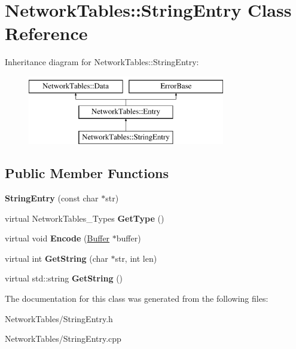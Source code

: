 \hypertarget{classNetworkTables_1_1StringEntry}{
\section{NetworkTables::StringEntry Class Reference}
\label{classNetworkTables_1_1StringEntry}
}
Inheritance diagram for NetworkTables::StringEntry:\begin{figure}[H]
\begin{center}
\leavevmode
\includegraphics[height=3.000000cm]{classNetworkTables_1_1StringEntry}
\end{center}
\end{figure}
\subsection*{Public Member Functions}
\begin{DoxyCompactItemize}
\item 
\hypertarget{classNetworkTables_1_1StringEntry_a25a26ba1aa1fcc3b678e14792e6e8b65}{
{\bfseries StringEntry} (const char $\ast$str)}
\label{classNetworkTables_1_1StringEntry_a25a26ba1aa1fcc3b678e14792e6e8b65}

\item 
\hypertarget{classNetworkTables_1_1StringEntry_a5299afb33eefea963add45e49b889256}{
virtual NetworkTables\_\-Types {\bfseries GetType} ()}
\label{classNetworkTables_1_1StringEntry_a5299afb33eefea963add45e49b889256}

\item 
\hypertarget{classNetworkTables_1_1StringEntry_a65c375f1eec933aa8a2e4c1e261f1038}{
virtual void {\bfseries Encode} (\hyperlink{classNetworkTables_1_1Buffer}{Buffer} $\ast$buffer)}
\label{classNetworkTables_1_1StringEntry_a65c375f1eec933aa8a2e4c1e261f1038}

\item 
\hypertarget{classNetworkTables_1_1StringEntry_aba6ff550b0ac0bc61aa11b0405c4ffd8}{
virtual int {\bfseries GetString} (char $\ast$str, int len)}
\label{classNetworkTables_1_1StringEntry_aba6ff550b0ac0bc61aa11b0405c4ffd8}

\item 
\hypertarget{classNetworkTables_1_1StringEntry_aeb8fd67e58468f9e8f48e28d9ce397f7}{
virtual std::string {\bfseries GetString} ()}
\label{classNetworkTables_1_1StringEntry_aeb8fd67e58468f9e8f48e28d9ce397f7}

\end{DoxyCompactItemize}


The documentation for this class was generated from the following files:\begin{DoxyCompactItemize}
\item 
NetworkTables/StringEntry.h\item 
NetworkTables/StringEntry.cpp\end{DoxyCompactItemize}
